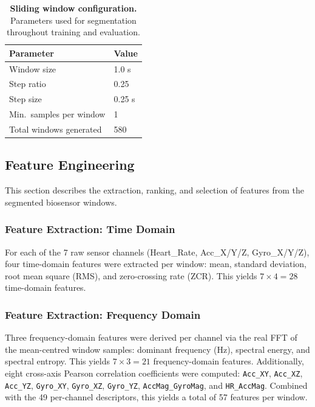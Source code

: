 \documentclass[12pt,a4paper]{cibb}
\begin{document}
\begin{table}[H]
\centering
\small
\begin{tabularx}{0.45\textwidth}{lX}
    \toprule
    \textbf{Parameter} & \textbf{Value} \\
    \midrule
    \rowcolor{LightBlue} Window size & 1.0 s \\
    Step ratio & 0.25 \\
    \rowcolor{LightBlue} Step size & 0.25 s \\
    Min.\ samples per window & 1 \\
    \rowcolor{LightBlue} Total windows generated & 580 \\
    \bottomrule
\end{tabularx}
\caption{\textbf{Sliding window configuration.} Parameters used for segmentation throughout training and evaluation.\label{tab:window-config}}
\end{table}

\subsection{Feature Engineering}
\label{sec:FEATURES}
This section describes the extraction, ranking, and selection of features from the segmented biosensor windows.

\subsubsection{Feature Extraction: Time Domain}
For each of the 7 raw sensor channels (Heart\_Rate, Acc\_X/Y/Z, Gyro\_X/Y/Z), four time-domain features were extracted per window: mean, standard deviation, root mean square (RMS), and zero-crossing rate (ZCR). This yields $7 \times 4 = 28$ time-domain features.

\subsubsection{Feature Extraction: Frequency Domain}
Three frequency-domain features were derived per channel via the real FFT of the mean-centred window samples: dominant frequency (Hz), spectral energy, and spectral entropy. This yields $7 \times 3 = 21$ frequency-domain features. Additionally, eight cross-axis Pearson correlation coefficients were computed: \texttt{Acc\_XY}, \texttt{Acc\_XZ}, \texttt{Acc\_YZ}, \texttt{Gyro\_XY}, \texttt{Gyro\_XZ}, \texttt{Gyro\_YZ}, \texttt{AccMag\_GyroMag}, and \texttt{HR\_AccMag}. Combined with the 49 per-channel descriptors, this yields a total of 57 features per window.
\end{document}
